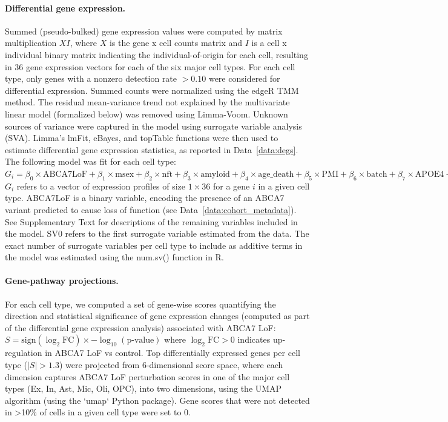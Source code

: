 \documentclass[12pt]{article}
\begin{document}
\paragraph{Differential gene expression.}
Summed (pseudo-bulked) gene expression values were computed by matrix multiplication $ X I $, where $ X $ is the gene x cell counts matrix and $ I $ is a cell x individual binary matrix indicating the individual-of-origin for each cell, resulting in 36 gene expression vectors for each of the six major cell types. For each cell type, only genes with a nonzero detection rate $ > 0.10 $ were considered for differential expression. Summed counts were normalized using the edgeR TMM method. The residual mean-variance trend not explained by the multivariate linear model (formalized below) was removed using Limma-Voom. Unknown sources of variance were captured in the model using surrogate variable analysis (SVA). Limma’s lmFit, eBayes, and topTable functions were then used to estimate differential gene expression statistics, as reported in Data~\ref{data:degs}. The following model was fit for each cell type:
$ G_i = \beta_0 \times \text{ABCA7LoF} + \beta_1 \times \text{msex} + \beta_2 \times \text{nft} + \beta_3 \times \text{amyloid} + \beta_4 \times \text{age\_death} + \beta_5 \times \text{PMI} + \beta_6 \times \text{batch} + \beta_7 \times \text{APOE4} + \beta_8 \times \text{SV0} $
$ G_i $ refers to a vector of expression profiles of size $ 1 \times 36 $ for a gene $ i $ in a given cell type. ABCA7LoF is a binary variable, encoding the presence of an ABCA7 variant predicted to cause loss of function (see Data~\ref{data:cohort_metadata}). See Supplementary Text for descriptions of the remaining variables included in the model. SV0 refers to the first surrogate variable estimated from the data. The exact number of surrogate variables per cell type to include as additive terms in the model was estimated using the num.sv() function in R. 

\paragraph{Gene-pathway projections.}
For each cell type, we computed a set of gene-wise scores quantifying the direction and statistical significance of gene expression changes (computed as part of the differential gene expression analysis) associated with ABCA7 LoF:
$ S = \text{sign}(\log_2\text{FC}) \times -\log_{10}(\text{p-value}) $
where $\log_2\text{FC} > 0$ indicates up-regulation in ABCA7 LoF vs control. Top differentially expressed genes per cell type ($|S| > 1.3$) were projected from 6-dimensional score space, where each dimension captures ABCA7 LoF perturbation scores in one of the major cell types (Ex, In, Ast, Mic, Oli, OPC), into two dimensions, using the UMAP algorithm (using the `umap` Python package). Gene scores that were not detected in >10\% of cells in a given cell type were set to 0.
\end{document}
